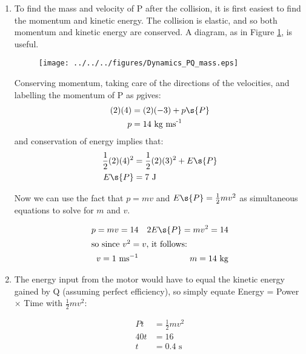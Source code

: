 \begin{problem}[AO1984PIQ1a]
{\begin{enumerate}
In order to work out the maximum tension; we need to relate the tension in the elastic to the extension: the force required to stretch the elastic is $\vtr{F} = k\vtr{x}$ where $k$ is commonly called the spring constant, and so the tension, which is equal in magnitude but opposite in sign, must be $kx$. The constant $k$ can be found by considering the energy stored $E = \frac{1}{2}kx^{2}$ and we know both $E$ and $x$:
\begin{equation*} k = \frac{E}{x^{2}} = \frac{16}{(0.5)^{2}} \textrm{ N m}^{-1} = 128 \textrm{ N m}^{-1} \end{equation*}
and so the tension, which is maximum at the maximum extension, is:
\begin{equation*} T\s{max} = kx = (128)(0.5) \textrm{ N} = 64 \textrm{ N} \end{equation*}
	\item To find the mass and velocity of P after the collision, it is first easiest to find the momentum and kinetic energy. The collision is elastic, and so both momentum and kinetic energy are conserved. A diagram, as in Figure \ref{fig:Dynamics_PQ_mass}, is useful.
	
\begin{figure}[h]
	\centering
	\texttt{[image: ../../../figures/Dynamics\_PQ\_mass.eps]}
	\caption{}\label{fig:Dynamics_PQ_mass}
\end{figure}

Conserving momentum, taking care of the directions of the velocities, and labelling the momentum of P as $p$gives:
\begin{align*} 
(2)(4) &= (2)(-3) + p\s{P}  \\ 
p &= 14 \text{ kg ms}^{\text{-1}}
\end{align*}
and conservation of energy implies that:
\begin{align*} 
\frac{1}{2}(2)(4)^{2} &= \frac{1}{2}(2)(3)^{2} + E\s{P}  \\
 E\s{P} &= 7 \text{ J} 
 \end{align*}

Now we can use the fact that $p = mv$ and $E\s{P} = \frac{1}{2}mv^{2}$ as simultaneous equations to solve for $m$ and $v$.

\begin{align*} 
p = mv = 14 &&  2E\s{P} = mv^{2} = 14 \\ 
\intertext{so since $v^{2} = v$, it follows:} v = 1 \text{ ms}^{-1} && m = 14 \text{ kg} 
\end{align*}

	\item The energy input from the motor would have to equal the kinetic energy gained by Q (assuming perfect efficiency), so simply equate Energy = Power $\times$ Time with $\frac{1}{2}mv^{2}$:

\begin{align*} 
Pt &= \frac{1}{2}mv^{2} \\
 40t &= 16 \\ 
 t&=0.4\text{ s} 
 \end{align*}

\end{enumerate}
}
\end{problem}